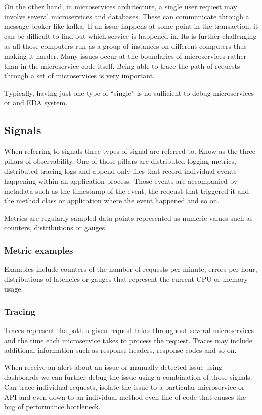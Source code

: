 \documentclass[a4paper, 11pt]{book}
\begin{document}
{    On the other hand, in microservices architecture, a single user request may involve several microservices and databases.
    These can communicate through a message broker like kafka.
    If an issue happens at some point in the transaction, it can be difficult to find out which service is happened in.
    Its is further challenging as all those computers run as a group of instances on different computers thus making it harder.
    Many issues occur at the boundaries of microservices rather than in the microservice code itself.
    Being able to trace the path of requests through a set of microservices is very important.

    Typically, having just one type of ``single'' is no sufficient to debug microservices or and EDA system.

    \subsection{Signals}
    When referring to signals three types of signal are referred to.
    Know as the three pillars of observability.
    One of those pillars are distributed logging metrics, distributed tracing logs and append only files that record individual events happening within an application process.
    Those events are accompanied by metadata such as the timestamp of the event, the reqeust that triggered it and the method class or application where the event happened and so on.

    Metrics are regularly sampled data points represented as numeric values such as counters, distributions or gauges.

    \subsubsection{Metric examples}
    Examples include counters of the number of requests per minute, errors per hour, distributions of latencies or gauges that represent the current CPU or memory usage.

    \subsubsection{Tracing}
    Traces represent the path a given request takes throughout several microservices and the time each microservice takes to process the request.
    Traces may include additional information such as response headers, response codes and so on.

    When receive an alert about an issue or manually detected issue using dashboards we can further debug the issue using a combination of those signals.
    Can trace individual requests, isolate the issue to a particular microservice or API and even down to an individual method even line of code that causes the bug of performance bottleneck.

}
\end{document}
